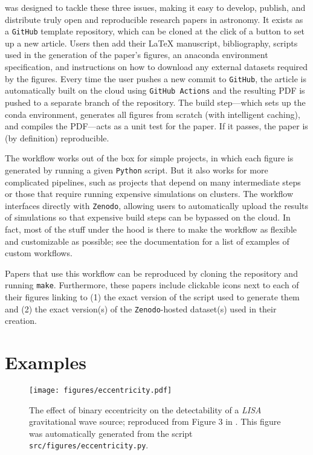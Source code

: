 \documentclass[twocolumn]{aastex631}
\begin{document}
\showyourwork was designed to tackle these three issues, making it easy to develop, publish, and distribute truly open and reproducible research papers in astronomy. 
It exists as a \texttt{GitHub} template repository, which can be cloned at the click of a button to set up a new article. 
Users then add their LaTeX manuscript, bibliography, scripts used in the generation of the paper's figures, an anaconda environment specification, and instructions on how to download any external datasets required by the figures. 
Every time the user pushes a new commit to \texttt{GitHub}, the article is automatically built on the cloud using \texttt{GitHub Actions} and the resulting PDF is pushed to a separate branch of the repository. 
The build step—which sets up the conda environment, generates all figures from scratch (with intelligent caching), and compiles the PDF—acts as a unit test for the paper. 
If it passes, the paper is (by definition) reproducible.

The workflow works out of the box for simple projects, in which each figure is generated by running a given \texttt{Python} script. 
But it also works for more complicated pipelines, such as projects that depend on many intermediate steps or those that require running expensive simulations on clusters. 
The workflow interfaces directly with \texttt{Zenodo}, allowing users to automatically upload the results of simulations so that expensive build steps can be bypassed on the cloud. 
In fact, most of the stuff under the hood is there to make the workflow as flexible and customizable as possible; see the documentation for a list of examples of custom workflows.

Papers that use this workflow can be reproduced by cloning the repository and running \texttt{make}. 
Furthermore, these papers include clickable icons next to each of their figures linking to (1) the exact version of the script used to generate them and (2) the exact version(s) of the \texttt{Zenodo}-hosted dataset(s) used in their creation.

\section{Examples}
\label{sec:examples}

\begin{figure}[ht!]
    \begin{centering}
        \texttt{[image: figures/eccentricity.pdf]}
        \caption{
            The effect of binary eccentricity on the detectability of a \emph{LISA} gravitational wave source; reproduced from Figure 3 in \citet{Wagg2022}. 
            This figure was automatically generated from the script \texttt{src/figures/eccentricity.py}.
        }
        \label{fig:eccentricity}
    \end{centering}
\end{figure}
\end{document}
